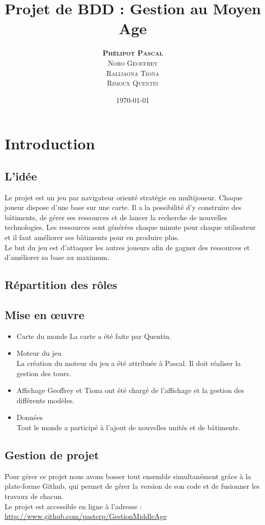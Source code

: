\documentclass[11pt,a4paper]{article}
\author{\textsc{\textbf{Phélipot Pascal}}\\\textsc{Noro Geoffrey}\\\textsc{Ralijaona Tiona}\\\textsc{Rimoux Quentin}}
\title{Projet de BDD : Gestion au Moyen Age}
\date\today
\begin{document}
\maketitle
\pagestyle{plain}
\newpage
\tableofcontents

\newpage{}
\section{Introduction}
\subsection{L'idée}
Le projet est un jeu par navigateur orienté stratégie en multijoueur. 
Chaque joueur dispose d'une base sur une carte. Il a la possibilité d'y construire des bâtiments, de gérer ses ressources et de lancer la recherche de nouvelles technologies.
Les ressources sont générées chaque minute pour chaque utilisateur et il faut améliorer ses bâtiments pour en produire plus. \\
Le but du jeu est d'attaquer les autres joueurs afin de gagner des ressources et d'améliorer sa base au maximum. \\


\subsection{Répartition des rôles}
\subsection{Mise en œuvre}
\begin{itemize}
	\item Carte du monde 
	La carte a été faite par Quentin.
	\item Moteur du jeu \\
	La création du moteur du jeu a été attribuée à Pascal. Il doit réaliser la gestion des tours.
	\item Affichage
	Geoffrey et Tiona ont été chargé de l'affichage et la gestion des différents modèles. 
	\item Données \\
	Tout le monde a participé à l'ajout de nouvelles unités et de bâtiments.
\end{itemize}
\subsection{Gestion de projet}
Pour gérer ce projet nous avons bosser tout ensemble simultanément grâce à la plate-forme Github, qui permet de gérer la version de son code et de fusionner les travaux de chacun.\\
Le projet est accessible en ligne à l'adresse :  \url{http://www.github.com/pasterp/GestionMiddleAge}
\end{document}
